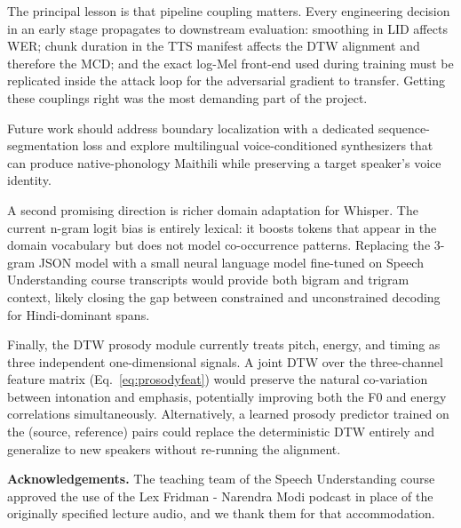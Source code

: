\documentclass[10pt,twocolumn,letterpaper]{article}
\begin{document}
The principal lesson is that pipeline coupling matters.  Every
engineering decision in an early stage propagates to downstream
evaluation: smoothing in LID affects WER; chunk duration in the TTS
manifest affects the DTW alignment and therefore the MCD; and the
exact log-Mel front-end used during training must be replicated
inside the attack loop for the adversarial gradient to transfer.
Getting these couplings right was the most demanding part of the
project.

Future work should address boundary localization with a dedicated
sequence-segmentation loss and explore multilingual voice-conditioned
synthesizers that can produce native-phonology Maithili while
preserving a target speaker's voice identity.

A second promising direction is richer domain adaptation for Whisper.
The current n-gram logit bias is entirely lexical: it boosts tokens
that appear in the domain vocabulary but does not model
co-occurrence patterns.  Replacing the 3-gram JSON model with a
small neural language model fine-tuned on Speech Understanding
course transcripts would provide both bigram and trigram context,
likely closing the gap between constrained and unconstrained
decoding for Hindi-dominant spans.

Finally, the DTW prosody module currently treats pitch, energy, and
timing as three independent one-dimensional signals.  A joint
DTW over the three-channel feature matrix
(Eq.~\ref{eq:prosodyfeat}) would preserve the natural co-variation
between intonation and emphasis, potentially improving both the
F0 and energy correlations simultaneously.  Alternatively,
a learned prosody predictor trained on the (source, reference) pairs
could replace the deterministic DTW entirely and generalize to
new speakers without re-running the alignment.

\noindent\textbf{Acknowledgements.}
The teaching team of the Speech Understanding course approved
the use of the Lex Fridman - Narendra Modi podcast in place of
the originally specified lecture audio, and we thank them for
that accommodation.

{\small


}
\end{document}
